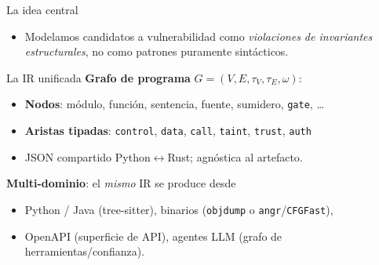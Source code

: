 \documentclass[aspectratio=169,11pt]{beamer}
\begin{document}
\begin{frame}{La idea central}
  \begin{center}
  \end{center}
  \begin{itemize}
    \item Modelamos candidatos a vulnerabilidad como \emph{violaciones de invariantes estructurales}, no como patrones puramente sintácticos.
  \end{itemize}
\end{frame}

\begin{frame}{La IR unificada}
  \textbf{Grafo de programa} $G=(V,E,\tau_V,\tau_E,\omega)$:
  \begin{itemize}
    \item \textbf{Nodos}: módulo, función, sentencia, fuente, sumidero, \texttt{gate}, \dots
    \item \textbf{Aristas tipadas}: \texttt{control}, \texttt{data}, \texttt{call}, \texttt{taint}, \texttt{trust}, \texttt{auth}
    \item JSON compartido Python$\leftrightarrow$Rust; agnóstica al artefacto.
  \end{itemize}
  \vspace{2mm}
  \textbf{Multi-dominio}: el \emph{mismo} IR se produce desde
  \begin{itemize}
    \item Python / Java (tree-sitter), binarios (\texttt{objdump} o \texttt{angr}/\texttt{CFGFast}),
    \item OpenAPI (superficie de API), agentes LLM (grafo de herramientas/confianza).
  \end{itemize}
\end{frame}
\end{document}
